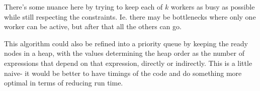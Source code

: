 \documentclass[12pt]{article}
\begin{document}
There's some nuance here by trying to keep each of $k$ workers as busy as
possible while still respecting the constraints. Ie. there may be
bottlenecks where only one worker can be active, but after that all the
others can go.

This algorithm could also be refined into a priority queue by keeping the ready
nodes in a heap, with the values determining the heap order as the number
of expressions that depend on that expression, directly or indirectly. This
is a little naive- it would be better to have timings of the code and do
something more optimal in terms of reducing run time.

\newpage


 
\end{document}
